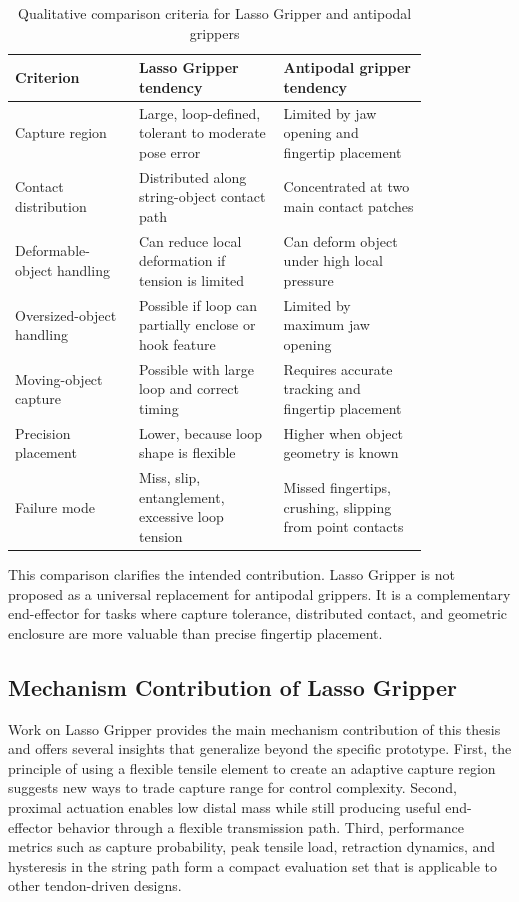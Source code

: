 \begin{table}[htbp]
    \centering
    \caption{Qualitative comparison criteria for Lasso Gripper and antipodal grippers}
    \label{tab:lasso_antipodal_criteria}
    \begin{tabular}{p{0.24\linewidth} p{0.29\linewidth} p{0.29\linewidth}}
        \toprule
        Criterion & Lasso Gripper tendency & Antipodal gripper tendency \\
        \midrule
        Capture region & Large, loop-defined, tolerant to moderate pose error & Limited by jaw opening and fingertip placement \\
        Contact distribution & Distributed along string-object contact path & Concentrated at two main contact patches \\
        Deformable-object handling & Can reduce local deformation if tension is limited & Can deform object under high local pressure \\
        Oversized-object handling & Possible if loop can partially enclose or hook feature & Limited by maximum jaw opening \\
        Moving-object capture & Possible with large loop and correct timing & Requires accurate tracking and fingertip placement \\
        Precision placement & Lower, because loop shape is flexible & Higher when object geometry is known \\
        Failure mode & Miss, slip, entanglement, excessive loop tension & Missed fingertips, crushing, slipping from point contacts \\
        \bottomrule
    \end{tabular}
\end{table}

This comparison clarifies the intended contribution. Lasso Gripper is not proposed as a universal replacement for antipodal grippers. It is a complementary end-effector for tasks where capture tolerance, distributed contact, and geometric enclosure are more valuable than precise fingertip placement.

\subsection{Mechanism Contribution of Lasso Gripper}

Work on Lasso Gripper provides the main mechanism contribution of this thesis and offers several insights that generalize beyond the specific prototype. First, the principle of using a flexible tensile element to create an adaptive capture region suggests new ways to trade capture range for control complexity. Second, proximal actuation enables low distal mass while still producing useful end-effector behavior through a flexible transmission path. Third, performance metrics such as capture probability, peak tensile load, retraction dynamics, and hysteresis in the string path form a compact evaluation set that is applicable to other tendon-driven designs.


